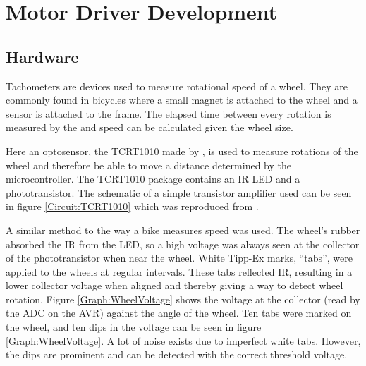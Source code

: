 \section{Motor Driver Development}\label{Section:Motor_Dev}

\subsection{Hardware}
Tachometers are devices used to measure rotational speed of a wheel. They are commonly found in bicycles where a small magnet is attached to the wheel and a sensor is attached to the frame. The elapsed time between every rotation is measured by the and speed can be calculated given the wheel size. 

Here an optosensor, the TCRT1010 made by \cite{Vishay:TCRT1010:Datasheet}, is used to measure rotations of the wheel and therefore be able to move a distance determined by the microcontroller. The TCRT1010 package contains an IR LED and a phototransistor. The schematic of a simple transistor amplifier used can be seen in figure \ref{Circuit:TCRT1010} which was reproduced from \cite{c9Lab:SRG}. 

A similar method to the way a bike measures speed was used. The wheel's rubber absorbed the IR from the LED, so a high voltage was always seen at the collector of the phototransistor when near the wheel. White Tipp-Ex marks, ``tabs'', were applied to the wheels at regular intervals. These tabs reflected IR, resulting in a lower collector voltage when aligned and thereby giving a way to detect wheel rotation. Figure \ref{Graph:WheelVoltage} shows the voltage at the collector (read by the ADC on the AVR) against the angle of the wheel. Ten tabs were marked on the wheel, and ten dips in the voltage can be seen in figure \ref{Graph:WheelVoltage}. A lot of noise exists due to imperfect white tabs. However, the dips are prominent and can be detected with the correct threshold voltage.

